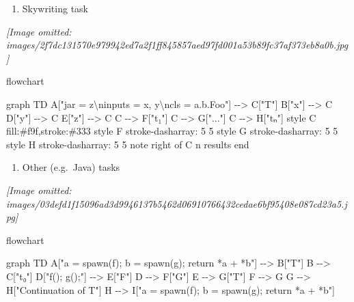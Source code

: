 \documentclass[
]{article}
\newenvironment{Shaded}{}{}
\newcommand{\NormalTok}[1]{#1}
\providecommand{\tightlist}{%
  \setlength{\itemsep}{0pt}\setlength{\parskip}{0pt}}
\begin{document}
\begin{enumerate}
\def\labelenumi{(\alph{enumi})}
\tightlist
\item
  Skywriting task
\end{enumerate}

\textit{[Image omitted: images/2f7dc131570e979942ed7a2f1ff845857aed97fd001a53b89fc37af373eb8a0b.jpg]}

flowchart

\begin{Shaded}
\begin{Highlighting}[]
\NormalTok{graph TD}
\NormalTok{    A["jar = z\textbackslash{}ninputs = x, y\textbackslash{}ncls = a.b.Foo"] {-}{-}\textgreater{} C["T"]}
\NormalTok{    B["x"] {-}{-}\textgreater{} C}
\NormalTok{    D["y"] {-}{-}\textgreater{} C}
\NormalTok{    E["z"] {-}{-}\textgreater{} C}
\NormalTok{    C {-}{-}\textgreater{} F["t₁"]}
\NormalTok{    C {-}{-}\textgreater{} G["..."]}
\NormalTok{    C {-}{-}\textgreater{} H["tₙ"]}
\NormalTok{    style C fill:\#f9f,stroke:\#333}
\NormalTok{    style F stroke{-}dasharray: 5 5}
\NormalTok{    style G stroke{-}dasharray: 5 5}
\NormalTok{    style H stroke{-}dasharray: 5 5}
\NormalTok{    note right of C}
\NormalTok{        n results}
\NormalTok{    end}
\end{Highlighting}
\end{Shaded}

\begin{enumerate}
\def\labelenumi{(\alph{enumi})}
\setcounter{enumi}{1}
\tightlist
\item
  Other (e.g.~Java) tasks
\end{enumerate}

\textit{[Image omitted: images/03defd1f15096ad3d9946137b5462d06910766432cedae6bf95408e087cd23a5.jpg]}

flowchart

\begin{Shaded}
\begin{Highlighting}[]
\NormalTok{graph TD}
\NormalTok{    A["a = spawn(f); b = spawn(g); return *a + *b"] {-}{-}\textgreater{} B["T"]}
\NormalTok{    B {-}{-}\textgreater{} C["t₀"]}
\NormalTok{    D["f(); g();"] {-}{-}\textgreater{} E["F"]}
\NormalTok{    D {-}{-}\textgreater{} F["G"]}
\NormalTok{    E {-}{-}\textgreater{} G["T\textquotesingle{}"]}
\NormalTok{    F {-}{-}\textgreater{} G}
\NormalTok{    G {-}{-}\textgreater{} H["Continuation of T"]}
\NormalTok{    H {-}{-}\textgreater{} I["a = spawn(f); b = spawn(g); return *a + *b"]}
\end{Highlighting}
\end{Shaded}
\end{document}
